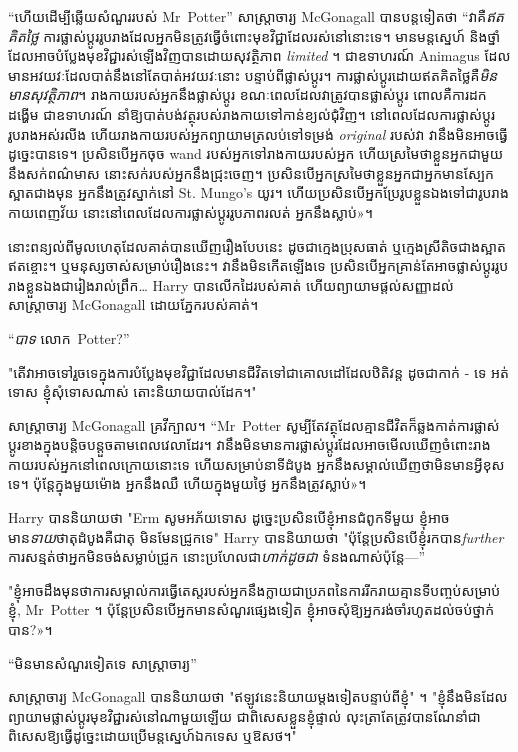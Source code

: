{“ហើយដើម្បីឆ្លើយសំណួររបស់ Mr~Potter” សាស្ត្រាចារ្យ McGonagall បានបន្តទៀតថា “វាគឺ\emph{ឥតគិតថ្លៃ} ការផ្លាស់ប្តូររូបរាងដែលអ្នកមិនត្រូវធ្វើចំពោះមុខវិជ្ជាដែលរស់នៅនោះទេ។ មានមន្តស្នេហ៍ និងថ្នាំដែលអាចបំប្លែងមុខវិជ្ជារស់ឡើងវិញបានដោយសុវត្ថិភាព \emph{limited} ។ ជាឧទាហរណ៍ Animagus ដែលមានអវយវៈដែលបាត់នឹងនៅតែបាត់អវយវៈនោះ បន្ទាប់ពីផ្លាស់ប្តូរ។ ការផ្លាស់ប្តូរដោយឥតគិតថ្លៃគឺ\emph{មិនមានសុវត្ថិភាព}។ រាងកាយរបស់អ្នកនឹងផ្លាស់ប្តូរ ខណៈពេលដែលវាត្រូវបានផ្លាស់ប្តូរ ពោលគឺការដកដង្ហើម ជាឧទាហរណ៍ នាំឱ្យបាត់បង់វត្ថុរបស់រាងកាយទៅកាន់ខ្យល់ជុំវិញ។ នៅពេលដែលការផ្លាស់ប្តូររូបរាងអស់រលីង ហើយរាងកាយរបស់អ្នកព្យាយាមត្រលប់ទៅទម្រង់ \emph{original} របស់វា វានឹងមិនអាចធ្វើដូច្នេះបានទេ។ ប្រសិនបើអ្នកចុច wand របស់អ្នកទៅរាងកាយរបស់អ្នក ហើយស្រមៃថាខ្លួនអ្នកជាមួយនឹងសក់ពណ៌មាស នោះសក់របស់អ្នកនឹងជ្រុះចេញ។ ប្រសិនបើ​អ្នក​ស្រមៃ​ថា​ខ្លួន​អ្នក​ជា​អ្នក​មាន​ស្បែក​ស្អាត​ជាង​មុន អ្នក​នឹង​ត្រូវ​ស្នាក់​នៅ St. Mungo's យូរ។ ហើយ​ប្រសិន​បើ​អ្នក​ប្រែ​រូប​ខ្លួន​ឯង​ទៅ​ជា​រូប​រាង​កាយ​ពេញ​វ័យ នោះ​នៅ​ពេល​ដែល​ការ​ផ្លាស់​ប្តូរ​រូប​ភាព​រលត់ អ្នក​នឹង​ស្លាប់»។

នោះពន្យល់ពីមូលហេតុដែលគាត់បានឃើញរឿងបែបនេះ ដូចជាក្មេងប្រុសធាត់ ឬក្មេងស្រីតិចជាងស្អាតឥតខ្ចោះ។ ឬមនុស្សចាស់សម្រាប់រឿងនេះ។ វានឹងមិនកើតឡើងទេ ប្រសិនបើអ្នកគ្រាន់តែអាចផ្លាស់ប្តូររូបរាងខ្លួនឯងជារៀងរាល់ព្រឹក… Harry បានលើកដៃរបស់គាត់ ហើយព្យាយាមផ្តល់សញ្ញាដល់សាស្រ្តាចារ្យ McGonagall ដោយភ្នែករបស់គាត់។

“\emph{បាទ} លោក~Potter?”

"តើវាអាចទៅរួចទេក្នុងការបំប្លែងមុខវិជ្ជាដែលមានជីវិតទៅជាគោលដៅដែលឋិតិវន្ត ដូចជាកាក់ - ទេ អត់ទោស ខ្ញុំសុំទោសណាស់ តោះនិយាយបាល់ដែក។"

សាស្ត្រាចារ្យ McGonagall គ្រវីក្បាល។ “Mr~Potter សូម្បីតែវត្ថុដែលគ្មានជីវិតក៏ឆ្លងកាត់ការផ្លាស់ប្តូរខាងក្នុងបន្តិចបន្តួចតាមពេលវេលាដែរ។ វានឹងមិនមានការផ្លាស់ប្តូរដែលអាចមើលឃើញចំពោះរាងកាយរបស់អ្នកនៅពេលក្រោយនោះទេ ហើយសម្រាប់នាទីដំបូង អ្នកនឹងសម្គាល់ឃើញថាមិនមានអ្វីខុសទេ។ ប៉ុន្តែ​ក្នុង​មួយ​ម៉ោង អ្នក​នឹង​ឈឺ ហើយ​ក្នុង​មួយ​ថ្ងៃ អ្នក​នឹង​ត្រូវ​ស្លាប់»។

Harry បាននិយាយថា "Erm សូមអភ័យទោស ដូច្នេះប្រសិនបើខ្ញុំអានជំពូកទីមួយ ខ្ញុំអាចមាន\emph{ទាយ}ថាតុដំបូងគឺជាតុ មិនមែនជ្រូកទេ" Harry បាននិយាយថា "ប៉ុន្តែប្រសិនបើខ្ញុំរកបាន\emph {further} ការសន្មត់ថាអ្នកមិនចង់សម្លាប់ជ្រូក នោះប្រហែលជា\emph{ហាក់ដូចជា} ទំនងណាស់ប៉ុន្តែ—”

"ខ្ញុំអាចដឹងមុនថាការសម្គាល់ការធ្វើតេស្តរបស់អ្នកនឹងក្លាយជាប្រភពនៃការរីករាយគ្មានទីបញ្ចប់សម្រាប់ខ្ញុំ, Mr~Potter ។ ប៉ុន្តែ​ប្រសិន​បើ​អ្នក​មាន​សំណួរ​ផ្សេង​ទៀត ខ្ញុំ​អាច​សុំ​ឱ្យ​អ្នក​រង់ចាំ​រហូត​ដល់​ចប់​ថ្នាក់​បាន?»។

“មិនមានសំណួរទៀតទេ សាស្ត្រាចារ្យ”

សាស្រ្តាចារ្យ McGonagall បាននិយាយថា "ឥឡូវនេះនិយាយម្តងទៀតបន្ទាប់ពីខ្ញុំ" ។ "ខ្ញុំនឹងមិនដែលព្យាយាមផ្លាស់ប្តូរមុខវិជ្ជារស់នៅណាមួយឡើយ ជាពិសេសខ្លួនខ្ញុំផ្ទាល់ លុះត្រាតែត្រូវបានណែនាំជាពិសេសឱ្យធ្វើដូច្នេះដោយប្រើមន្តស្នេហ៍ឯកទេស ឬឱសថ។"

}
